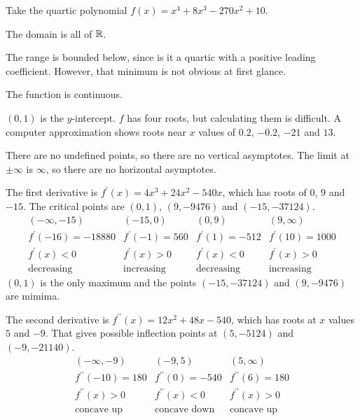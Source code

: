 \documentclass[fleqn]{report}
\begin{document}
\begin{example}
Take the quartic polynomial $f(x) = x^4+8x^3-270x^2+10$. 
\begin{smallparts}
\item The domain is all of $\mathbb{R}$.
\item The range is bounded below, since is it a quartic
with a positive leading coefficient. However, that minimum is
not obvious at first glance.
\item The function is continuous.
\item $(0,1)$ is the $y$-intercept.
$f$ has four roots, but calculating them is difficult. A
computer approximation shows roots near $x$ values of $0.2$,
$-0.2$, $-21$ and $13$.
\item There are no undefined points, so there are no vertical
asymptotes. The limit at $\pm \infty$ is $\infty$, so there
are no horizontal asymptotes.
\item The first derivative is $f^\prime (x) = 4x^3 + 24x^2 -
540x$, which has roots of $0$, $9$ and $-15$. The critical
points are $(0, 1)$, $(9, -9476)$ and $(-15, -37124)$. 
\begin{displaymath}
\begin{array}{cccc}
(-\infty, -15) & (-15,0) & (0,9) & (9, \infty) \\[1em]
f^\prime(-16) = -18880 & f^\prime(-1) = 560 & f^\prime(1) =
-512 & f^\prime(10) = 1000 \\[1em]
f^\prime(x) < 0 & f^\prime(x) > 0 & f^\prime(x) < 0 &
f^\prime(x) > 0 \\[1em]
\text{decreasing} & \text{increasing} & \text{decreasing} &
\text{increasing}
\end{array}
\end{displaymath}
$(0,1)$ is the only maximum and the
points $(-15, -37124)$ and $(9, -9476)$ are mimima.
\item The second derivative is $f^{\prime \prime}(x) = 12x^2 +
48 x - 540$, which has roots at $x$ values $5$ and $-9$. That
gives possible inflection points at $(5, -5124)$ and $(-9,
-21140)$. 
\begin{displaymath}
\begin{array}{ccc}
(-\infty, -9) & (-9,5) & (5, \infty) \\[1em]
f^{\prime\prime}(-10) = 180 & f^{\prime\prime}(0) = -540 &
f^{\prime\prime}(6) = 180 \\[1em]
f^{\prime\prime}(x) > 0 & f^{\prime\prime}(x) < 0 &
f^{\prime\prime} (x) > 0 \\[1em]
\text{concave up} & \text{concave down} & \text{concave up}
\end{array}
\end{displaymath}
\end{smallparts}
\end{example}
\end{document}
